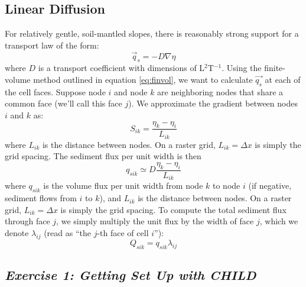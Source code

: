 \documentclass[12pt,reqno]{amsart}
\begin{document}
\subsection{Linear Diffusion}

For relatively gentle, soil-mantled slopes, there is reasonably strong support for a transport law of the form:
\begin{equation}
\vec{q}_s = -D \nabla \eta
\end{equation}
where $D$ is a transport coefficient with dimensions of L$^2$T$^{-1}$. Using the finite-volume method outlined in equation \ref{eq:finvol}, we want to calculate $\vec{q_s}$ at each of the cell faces. Suppose node $i$ and node $k$ are neighboring nodes that share a common face (we'll call this face $j$). We approximate the gradient between nodes $i$ and $k$ as:
\begin{equation}
S_{ik} = \frac{\eta_k - \eta_i}{L_{ik}}
\end{equation}
where $L_{ik}$ is the distance between nodes. On a raster grid, $L_{ik} = \Delta x$ is simply the grid spacing. The sediment flux per unit width is then
\begin{equation}
q_{sik} \simeq D \frac{\eta_k - \eta_i}{L_{ik}}
\end{equation} 
where $q_{sik}$ is the volume flux per unit width from node $k$ to node $i$ (if negative, sediment flows from $i$ to $k$), and $L_{ik}$ is the distance between nodes. On a raster grid, $L_{ik} = \Delta x$ is simply the grid spacing. To compute the total sediment flux through face $j$, we simply multiply the unit flux by the width of face $j$, which we denote $\lambda_{ij}$ (read as ``the $j$-th face of cell $i$''):
\begin{equation}
Q_{sik} = q_{sik} \lambda_{ij}
\end{equation}

\subsection*{\bf\em Exercise 1: Getting Set Up with CHILD}
\end{document}
